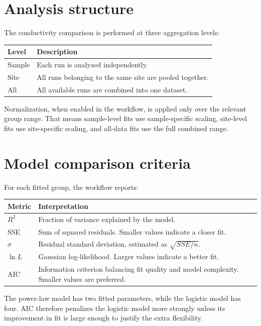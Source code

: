 \documentclass[11pt]{article}
\begin{document}
\section{Analysis structure}

The conductivity comparison is performed at three aggregation levels:

\begin{longtable}{p{} p{}}
\toprule
\textbf{Level} & \textbf{Description}\\
\midrule
\endhead
Sample & Each run is analyzed independently.\\
Site & All runs belonging to the same site are pooled together.\\
All & All available runs are combined into one dataset.\\
\bottomrule
\end{longtable}

Normalization, when enabled in the workflow, is applied only over the relevant group range.  
That means sample-level fits use sample-specific scaling, site-level fits use site-specific scaling, and all-data fits use the full combined range.

\section{Model comparison criteria}

For each fitted group, the workflow reports:

\begin{longtable}{p{} p{}}
\toprule
\textbf{Metric} & \textbf{Interpretation}\\
\midrule
\endhead
$R^2$ & Fraction of variance explained by the model.\\
SSE & Sum of squared residuals. Smaller values indicate a closer fit.\\
$\sigma$ & Residual standard deviation, estimated as $\sqrt{SSE/n}$.\\
$\ln L$ & Gaussian log-likelihood. Larger values indicate a better fit.\\
AIC & Information criterion balancing fit quality and model complexity. Smaller values are preferred.\\
\bottomrule
\end{longtable}

The power-law model has two fitted parameters, while the logistic model has four.  
AIC therefore penalizes the logistic model more strongly unless its improvement in fit is large enough to justify the extra flexibility.
\end{document}
